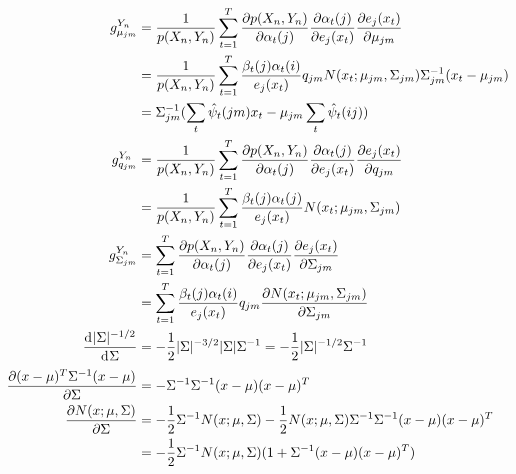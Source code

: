 \begin{align*}
g_{\mu_{jm}}^{Y_n} &= \frac{1}{p(X_n, Y_n)}\sum_{t = 1}^T \frac{\partial p(X_n, Y_n)}{\partial \alpha_t(j)}\frac{\partial \alpha_t(j)}{\partial e_j(x_t)}\frac{\partial e_j(x_t)}{\partial \mu_{jm}} \\
&= \frac{1}{p(X_n, Y_n)}\sum_{t = 1}^T\frac{\beta_t(j)\alpha_{t}(i)}{e_j(x_t)}q_{jm}N(x_t; \mu_{jm}, \Sigma_{jm})\Sigma_{jm}^{-1}(x_t - \mu_{jm}) \\
&= \Sigma_{jm}^{-1}(\sum_t \hat{\psi}_t(jm)x_t - \mu_{jm}\sum_t \hat{\psi}_t(ij))\\
g_{q_{jm}}^{Y_n} &= \frac{1}{p(X_n, Y_n)}\sum_{t = 1}^T \frac{\partial p(X_n, Y_n)}{\partial \alpha_t(j)}\frac{\partial \alpha_t(j)}{\partial e_j(x_t)}\frac{\partial e_j(x_t)}{\partial q_{jm}} \\
&= \frac{1}{p(X_n, Y_n)}\sum_{t = 1}^T\frac{\beta_t(j)\alpha_{t}(j)}{e_j(x_t)}N(x_t; \mu_{jm}, \Sigma_{jm}) \\
g_{\Sigma_{jm}}^{Y_n} &= \sum_{t = 1}^T \frac{\partial p(X_n, Y_n)}{\partial \alpha_t(j)}\frac{\partial \alpha_t(j)}{\partial e_j(x_t)}\frac{\partial e_j(x_t)}{\partial \Sigma_{jm}} \\
&= \sum_{t = 1}^T\frac{\beta_t(j)\alpha_{t}(i)}{e_j(x_t)}q_{jm}\frac{\partial N(x_t; \mu_{jm}, \Sigma_{jm})}{\partial\Sigma_{jm}}\\
\frac{\diff |\Sigma|^{-1/2}}{\diff\Sigma} &= -\frac{1}{2}|\Sigma|^{-3/2}|\Sigma|\Sigma^{-1} = -\frac{1}{2}|\Sigma|^{-1/2}\Sigma^{-1}\\
\frac{\partial (x-\mu)^T\Sigma^{-1}(x-\mu)}{\partial \Sigma} &= -\Sigma^{-1}\Sigma^{-1}(x-\mu)(x-\mu)^T\\
\frac{\partial N(x; \mu, \Sigma)}{\partial \Sigma} &= -\frac{1}{2}\Sigma^{-1}N(x; \mu, \Sigma) - \frac{1}{2}N(x; \mu, \Sigma)\Sigma^{-1}\Sigma^{-1}(x-\mu)(x-\mu)^T\\
&= -\frac{1}{2}\Sigma^{-1}N(x; \mu, \Sigma)(1 + \Sigma^{-1}(x-\mu)(x-\mu)^T)
\end{align*} 

